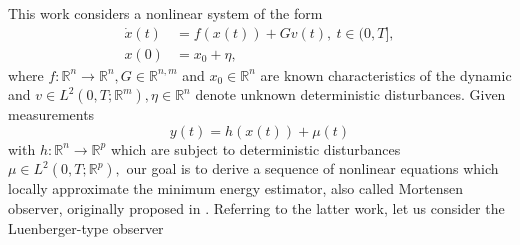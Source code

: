 \documentclass[11pt,reqno]{amsart}
\numberwithin{equation}{section}
\theoremstyle{plain}
\begin{document}
This work considers a nonlinear system of the form
\begin{equation}\label{eq: distSys}
	\begin{aligned}
		\dot{x}(t) &= f(x(t)) + G v(t),~ t \in (0,T],\\
		x(0) &= x_0 + \eta,
	\end{aligned} 
\end{equation}
where $f\colon \mathbb R^n\to \mathbb R^n, G\in \mathbb R^{n,m}$ and $x_0 \in \mathbb R^n$ are known characteristics of the dynamic and $v\in L^2(0,T;\mathbb R^m), \eta \in \mathbb R^n$ denote unknown deterministic disturbances. Given 
measurements 
\begin{equation}\label{eq: distMeas}
	y(t) = h(x(t)) + \mu(t)
\end{equation}
with $h\colon \mathbb R^n \to \mathbb R^p$ which are subject to deterministic disturbances $\mu \in L^2(0,T;\mathbb R^p),$ our goal is to derive a sequence of nonlinear equations which locally approximate the minimum energy estimator, also called Mortensen observer, originally proposed in \cite{Mor68}. Referring to the latter work, let us consider the Luenberger-type observer
\end{document}
